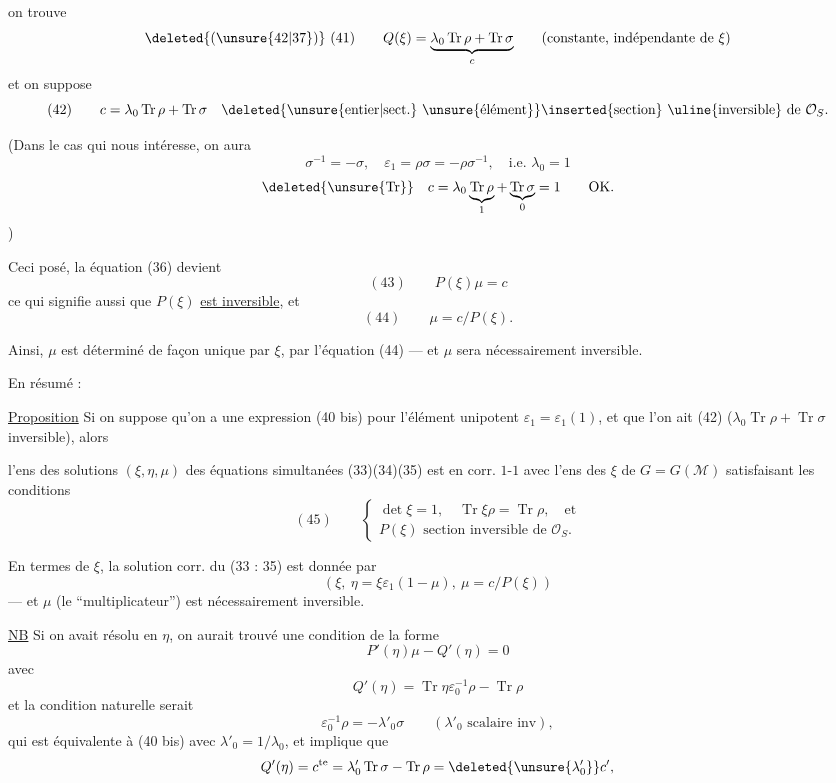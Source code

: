 on trouve
\[
\deleted{(\unsure{42|37})}\ (41)\qquad
Q(\xi)=\underbrace{\lambda_0\operatorname{Tr}\rho+\operatorname{Tr}\sigma}_{c}
\qquad
(\text{constante, indépendante de }\xi)
\]
et on suppose
\[
(42)\qquad
c=\lambda_0\operatorname{Tr}\rho+\operatorname{Tr}\sigma
\quad
\deleted{\text{\unsure{entier|sect.} \unsure{élément}}}
\inserted{\text{section}}\text{ \uline{inversible} de }\mathcal O_S.
\]

(Dans le cas qui nous intéresse, on aura
\[
\sigma^{-1}=-\sigma,\quad
\varepsilon_1=\rho\sigma=-\rho\sigma^{-1},\quad
\text{i.e. }\lambda_0=1
\]
\[
\deleted{\unsure{\operatorname{Tr}}}\quad
c=\lambda_0\underbrace{\operatorname{Tr}\rho}_{1}
+\underbrace{\operatorname{Tr}\sigma}_{0}=1
\qquad\text{OK.}
\]
)

Ceci posé, la  équation (36) devient
\[
(43)\qquad P(\xi)\mu=c
\]
ce qui signifie aussi que $P(\xi)$ \uline{est inversible}, et
\[
(44)\qquad \mu=c/P(\xi).
\]

Ainsi, $\mu$ est déterminé de façon unique par $\xi$, par l'équation (44) ---
et $\mu$ sera nécessairement inversible.

En résumé :

\uline{Proposition} Si on suppose qu'on a 
une expression (40 bis) pour l'élément unipotent
$\varepsilon_1=\varepsilon_1(1)$, et que l'on ait (42)
($\lambda_0\operatorname{Tr}\rho+\operatorname{Tr}\sigma$ inversible), alors


l'ens des solutions  $(\xi,\eta,\mu)$ des
équations simultanées (33)(34)(35)
est en corr. $1$-$1$ avec l'ens des $\xi$
 de $G=G(\mathcal{M})$
satisfaisant les conditions
\[
(45)\qquad
\left\{
\begin{gathered}
\det\xi=1,\quad \operatorname{Tr}\xi\rho=\operatorname{Tr}\rho,\quad\text{et}\\
P(\xi)\text{ section inversible de }\mathcal O_S.
\end{gathered}
\right.
\]

En termes de $\xi$, la solution corr. du  (33 : 35)
est donnée par
\[
(\xi,\ \eta=\xi\varepsilon_1(1-\mu),\ \mu=c/P(\xi))
\]
--- et $\mu$ (le “multiplicateur”) est nécessairement inversible.

\uline{NB} Si on avait résolu en $\eta$, on aurait
trouvé une condition de la forme
\[
P'(\eta)\mu-Q'(\eta)=0
\]
avec
\[
Q'(\eta)=\operatorname{Tr}\eta\varepsilon_0^{-1}\rho-\operatorname{Tr}\rho
\]
et la condition naturelle serait
\[
\varepsilon_0^{-1}\rho=-\lambda'_0\sigma
\qquad(\lambda'_0\text{ scalaire inv}),
\]
qui est équivalente à (40 bis) avec $\lambda'_0=1/\lambda_0$,
et implique que
\[
Q'(\eta)=c^{\mathrm{te}}
=\lambda'_0\operatorname{Tr}\sigma-\operatorname{Tr}\rho
=\deleted{\unsure{\lambda'_0}}c',
\]

